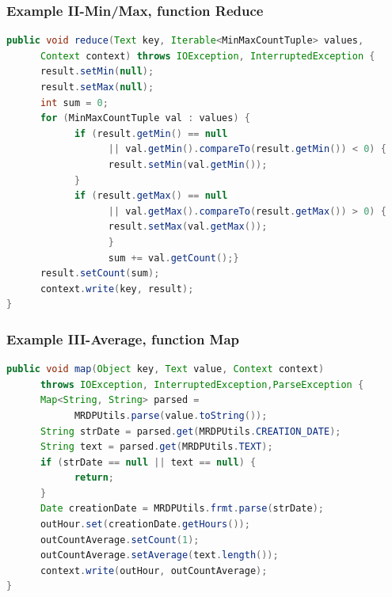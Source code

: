 \documentclass[xcolor=dvipsnames,dvip,notes=show,table]{beamer}
\begin{document}
\begin{frame}[fragile]
  \frametitle{Example II-Min/Max, function Reduce}

\begin{lstlisting}[language=Java]
public void reduce(Text key, Iterable<MinMaxCountTuple> values,
      Context context) throws IOException, InterruptedException {
      result.setMin(null);
      result.setMax(null);
      int sum = 0;
      for (MinMaxCountTuple val : values) {
            if (result.getMin() == null
                  || val.getMin().compareTo(result.getMin()) < 0) {
                  result.setMin(val.getMin());
            }
            if (result.getMax() == null
                  || val.getMax().compareTo(result.getMax()) > 0) {
                  result.setMax(val.getMax());
                  }
                  sum += val.getCount();}
      result.setCount(sum);
      context.write(key, result);
}
\end{lstlisting}

\end{frame}




\begin{frame}[fragile]
  \frametitle{Example III-Average, function Map}

\begin{lstlisting}[language=Java]
public void map(Object key, Text value, Context context)
      throws IOException, InterruptedException,ParseException {
      Map<String, String> parsed = 
            MRDPUtils.parse(value.toString());
      String strDate = parsed.get(MRDPUtils.CREATION_DATE);
      String text = parsed.get(MRDPUtils.TEXT);
      if (strDate == null || text == null) {
            return;
      }
      Date creationDate = MRDPUtils.frmt.parse(strDate);
      outHour.set(creationDate.getHours());
      outCountAverage.setCount(1);
      outCountAverage.setAverage(text.length());
      context.write(outHour, outCountAverage);
}
\end{lstlisting}

\end{frame}
\end{document}
